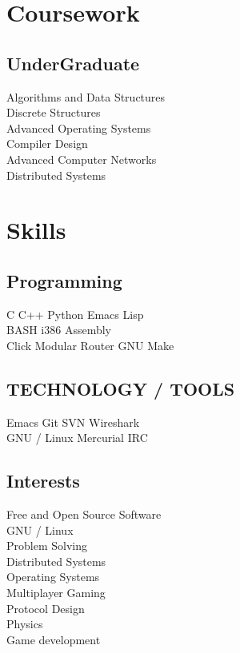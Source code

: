 \documentclass[letterpaper]{deedy-resume} %
\begin{document}
\begin{minipage}[t]{0.33\textwidth}
\section{Coursework}
\subsection{UnderGraduate}
Algorithms and Data Structures \\
Discrete Structures \\
Advanced Operating Systems \\
Compiler Design \\
Advanced Computer Networks \\
Distributed Systems \\
\sectionspace %
\section{Skills}
\subsection{Programming}
C \textbullet{} C++ \textbullet{} Python \textbullet{} Emacs Lisp\\
BASH \textbullet{} i386 Assembly \\
Click Modular Router  \textbullet{} GNU Make \\
\sectionspace %
\subsection{TECHNOLOGY / TOOLS}
Emacs \textbullet{} Git \textbullet{} SVN  \textbullet{} Wireshark \\
GNU / Linux \textbullet{} Mercurial \textbullet{}
IRC \textbullet{}  
\sectionspace %
\subsection{Interests}
Free and Open Source Software \\
GNU / Linux \\
Problem Solving \\
Distributed Systems \\
Operating Systems \\
Multiplayer Gaming \\
Protocol Design \\
Physics \\
Game development
\sectionspace %

\end{minipage} %
\end{document}
